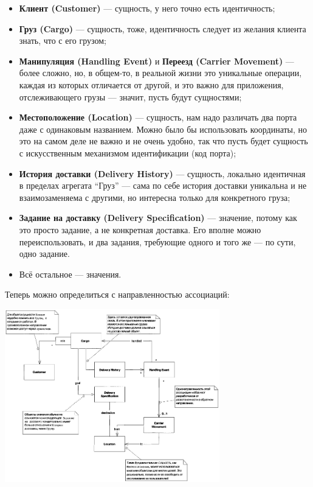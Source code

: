 \documentclass[a5paper]{article}
\begin{document}
\begin{itemize}
    \item \textbf{Клиент (Customer)} --- сущность, у него точно есть идентичность;
    \item \textbf{Груз (Cargo)} --- сущность, тоже, идентичность следует из желания клиента знать, что с его грузом;
    \item \textbf{Манипуляция (Handling Event)} и \textbf{Переезд (Carrier Movement)} --- более сложно, но, в общем-то, в реальной жизни это уникальные операции, каждая из которых отличается от другой, и это важно для приложения, отслеживающего грузы --- значит, пусть будут сущностями;
    \item \textbf{Местоположение (Location)} --- сущность, нам надо различать два порта даже с одинаковым названием. Можно было бы использовать координаты, но это на самом деле не важно и не очень удобно, так что пусть будет сущность с искусственным механизмом идентификации (код порта);
    \item \textbf{История доставки (Delivery History)} --- сущность, локально идентичная в пределах агрегата ``Груз'' --- сама по себе история доставки уникальна и не взаимозаменяема с другими, но интересна только для конкретного груза;
    \item \textbf{Задание на доставку (Delivery Specification)} --- значение, потому как это просто задание, а не конкретная доставка. Его вполне можно переиспользовать, и два задания, требующие одного и того же --- по сути, одно задание.
    \item Всё остальное --- значения.
\end{itemize}

Теперь можно определиться с направленностью ассоциаций:

\begin{center}
    \includegraphics[width=0.7\textwidth]{cargoAssociations.png}
\end{center}
\end{document}
